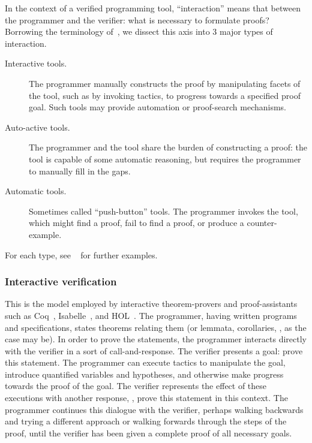 In the context of a verified programming tool, ``interaction'' means that
between the programmer and the verifier: what is necessary to formulate proofs?
Borrowing the terminology of~\cite[\S 2]{Nelson_2019}, we dissect this axis into
3 major types of interaction.
\begin{description}
    \item[Interactive tools.] The programmer manually constructs the proof by
        manipulating facets of the tool, such as by invoking tactics, to
        progress towards a specified proof goal. Such tools may provide
        automation or proof-search mechanisms.
    \item[Auto-active tools.] The programmer and the tool share the burden of
        constructing a proof: the tool is capable of some automatic reasoning,
        but requires the programmer to manually fill in the gaps.
    \item[Automatic tools.] Sometimes called ``push-button'' tools. The
        programmer invokes the tool, which might find a proof, fail to find a
        proof, or produce a counter-example.
\end{description}

For each type, see \citeauthor{Nelson_2019}~\cite{Nelson_2019} for further
examples.

\subsubsection{Interactive verification}

This is the model employed by interactive theorem-provers and proof-assistants
such as Coq~\cite{Coq}, Isabelle~\cite{Isabelle}, and HOL~\cite{HOL}. The
programmer, having written programs and specifications, states theorems relating
them (or lemmata, corollaries, \etc, as the case may be). In order to prove the
statements, the programmer interacts directly with the verifier in a sort of
call-and-response. The verifier presents a goal: prove this statement. The
programmer can execute tactics to manipulate the goal, introduce quantified
variables and hypotheses, and otherwise make progress towards the proof of the
goal. The verifier represents the effect of these executions with another
response, \eg, prove this statement in this context. The programmer continues
this dialogue with the verifier, perhaps walking backwards and trying a
different approach or walking forwards through the steps of the proof, until the
verifier has been given a complete proof of all necessary goals.

